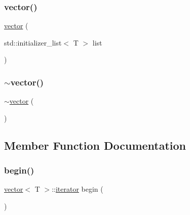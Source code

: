 \mbox{\label{classvector_acc1f450ecad1c00c720208371a6c9795}} 
\subsubsection{\texorpdfstring{vector()}{vector()}\hspace{0.1cm}{\footnotesize\ttfamily [4/4]}}
{\footnotesize\ttfamily \mbox{\hyperlink{classvector}{vector}} (\begin{DoxyParamCaption}\item[{std\+::initializer\+\_\+list$<$ T $>$}]{list }\end{DoxyParamCaption})\hspace{0.3cm}{\ttfamily [explicit]}}

\mbox{\label{classvector_a886de2f986508b10e3792cd1e148eb7d}} 
\subsubsection{\texorpdfstring{$\sim$vector()}{~vector()}}
{\footnotesize\ttfamily $\sim$\mbox{\hyperlink{classvector}{vector}} (\begin{DoxyParamCaption}{ }\end{DoxyParamCaption})}



\subsection{Member Function Documentation}
\mbox{\label{classvector_aab539612d29c3895d8d509f4b2bb83d5}} 
\subsubsection{\texorpdfstring{begin()}{begin()}}
{\footnotesize\ttfamily \mbox{\hyperlink{classvector}{vector}}$<$ T $>$\+::\mbox{\hyperlink{classvector_a35c955cacac6aacaa1e82874b1628865}{iterator}} begin (\begin{DoxyParamCaption}{ }\end{DoxyParamCaption})}

\mbox{\label{classvector_ae3d77c9f926f7ba0be3d154d0f7758d4}} 
